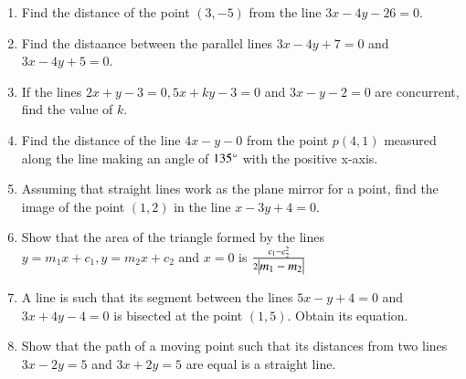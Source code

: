 \documentclass{article}
\theoremstyle{remark}
\begin{document}
\begin{enumerate}
\item Find the distance of the point $(3,-5)$ from the line $3x-4y-26=0$.
\item Find the distaance between the parallel lines $3x-4y+7=0$ and $3x-4y+5=0$.
\item If the lines $2x+y-3=0, 5x+ky-3=0$ and $3x-y-2=0$ are concurrent, find the value of $k$.
\item Find the distance of the line $4x-y-0$ from the point $p(4,1)$ measured along the line making an angle of $135\degree$ with the positive x-axis.
\item Assuming that straight lines work as the plane mirror for a point, find the image of the point $(1,2)$ in the line $x-3y+4=0$.
\item Show that the area of the triangle formed by the lines $y=m_1x+c_1, y=m_2x+c_2$ and $x=0$ is $\frac{c_1-c_2^2}{2\begin{vmatrix}m_1-m_2\end{vmatrix}}$
\item A line is such that its segment between the lines $5x-y+4=0$ and $3x+4y-4=0$ is bisected at the point $(1,5)$. Obtain its equation.
\item Show that the path of a moving point such that its distances from two lines $3x-2y=5$ and $3x+2y=5$ are equal is a straight line.
\end{enumerate}
\end{document}
